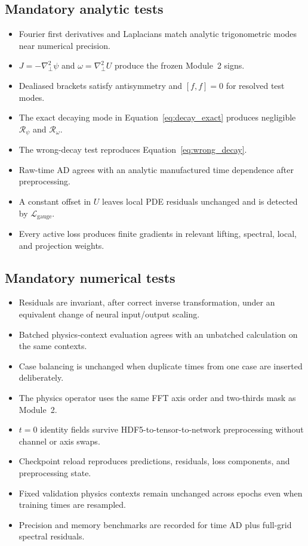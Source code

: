 \documentclass[11pt]{article}
\newcommand{\Lap}{\nabla_\perp^2}
\newcommand{\Rpsi}{\mathcal{R}_{\psi}}
\newcommand{\Romega}{\mathcal{R}_{\omega}}
\newcommand{\Lgauge}{\mathcal{L}_{\mathrm{gauge}}}
\begin{document}
\subsection{Mandatory analytic tests}
\begin{itemize}
  \item Fourier first derivatives and Laplacians match analytic trigonometric modes near numerical precision.
  \item $J=-\Lap\psi$ and $\omega=\Lap U$ produce the frozen Module~2 signs.
  \item Dealiased brackets satisfy antisymmetry and $[f,f]=0$ for resolved test modes.
  \item The exact decaying mode in Equation~\eqref{eq:decay_exact} produces negligible $\Rpsi$ and $\Romega$.
  \item The wrong-decay test reproduces Equation~\eqref{eq:wrong_decay}.
  \item Raw-time AD agrees with an analytic manufactured time dependence after preprocessing.
  \item A constant offset in $U$ leaves local PDE residuals unchanged and is detected by $\Lgauge$.
  \item Every active loss produces finite gradients in relevant lifting, spectral, local, and projection weights.
\end{itemize}

\subsection{Mandatory numerical tests}
\begin{itemize}
  \item Residuals are invariant, after correct inverse transformation, under an equivalent change of neural input/output scaling.
  \item Batched physics-context evaluation agrees with an unbatched calculation on the same contexts.
  \item Case balancing is unchanged when duplicate times from one case are inserted deliberately.
  \item The physics operator uses the same FFT axis order and two-thirds mask as Module~2.
  \item $t=0$ identity fields survive HDF5-to-tensor-to-network preprocessing without channel or axis swaps.
  \item Checkpoint reload reproduces predictions, residuals, loss components, and preprocessing state.
  \item Fixed validation physics contexts remain unchanged across epochs even when training times are resampled.
  \item Precision and memory benchmarks are recorded for time AD plus full-grid spectral residuals.
\end{itemize}
\end{document}
